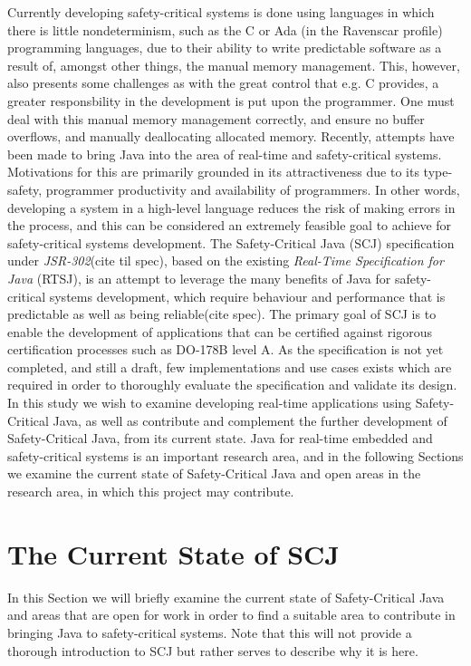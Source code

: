 Currently developing safety-critical systems is done using languages in which there is little nondeterminism, such as the C or Ada (in the Ravenscar profile) programming languages, due to their ability to write predictable software as a result of, amongst other things, the manual memory management. This, however, also presents some challenges as with the great control that e.g. C provides, a greater responsbility in the development is put upon the programmer. One must deal with this manual memory management correctly, and ensure no buffer overflows, and manually deallocating allocated memory.
Recently, attempts have been made to bring Java into the area of real-time and safety-critical systems. Motivations for this are primarily grounded in its attractiveness due to its type-safety, programmer productivity and availability of programmers. In other words, developing a system in a high-level language reduces the risk of making errors in the process, and this can be considered an extremely feasible goal to achieve for safety-critical systems development.
The Safety-Critical Java (SCJ) specification under \textit{JSR-302}\cite{JSR}(cite til spec), based on the existing \textit{Real-Time Specification for Java} (RTSJ), is an attempt to leverage the many benefits of Java for safety-critical systems development, which require behaviour and performance that is predictable as well as being reliable(cite spec). The primary goal of SCJ is to enable the development of applications that can be certified against rigorous certification processes such as DO-178B level A. As the specification is not yet completed, and still a draft, few implementations and use cases exists which are required in order to thoroughly evaluate the specification and validate its design.
In this study we wish to examine developing real-time applications using Safety-Critical Java, as well as contribute and complement the further development of Safety-Critical Java, from its current state. Java for real-time embedded and safety-critical systems is an important research area, and in the following Sections we examine the current state of Safety-Critical Java and open areas in the research area, in which this project may contribute.

\section{The Current State of SCJ}
In this Section we will briefly examine the current state of Safety-Critical Java and areas that are open for work in order to find a suitable area to contribute in bringing Java to safety-critical systems. Note that this will not provide a thorough introduction to SCJ but rather serves to describe why it is here.

